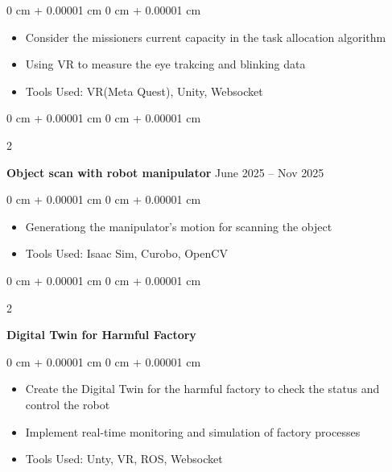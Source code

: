 \documentclass[10pt, letterpaper]{article}
\newenvironment{highlights}{
    \begin{itemize}[
        topsep=0.10 cm,
        parsep=0.10 cm,
        partopsep=0pt,
        itemsep=0pt,
        leftmargin=0 cm + 10pt
    ]
}{
    \end{itemize}
} %
\newenvironment{onecolentry}{
    \begin{adjustwidth}{
        0 cm + 0.00001 cm
    }{
        0 cm + 0.00001 cm
    }
}{
    \end{adjustwidth}
} %
\newenvironment{twocolentry}[2][]{
    \onecolentry
    \def\secondColumn{#2}
    \setcolumnwidth{\fill, 4.5 cm}
    \begin{paracol}{2}
}{
    \switchcolumn \raggedleft \secondColumn
    \end{paracol}
    \endonecolentry
} %
\begin{document}
        \vspace{0.10 cm}
        \begin{onecolentry}
            \begin{highlights}
                \item Consider the missioners current capacity in the task allocation algorithm
                \item Using VR to measure the eye trakcing and blinking data
                \item Tools Used: VR(Meta Quest), Unity, Websocket
            \end{highlights}
        \end{onecolentry}


        \vspace{0.2 cm}

        \begin{twocolentry}{
            June 2025 -- Nov 2025
        }
            \textbf{Object scan with robot manipulator}\end{twocolentry}

        \vspace{0.10 cm}
        \begin{onecolentry}
            \begin{highlights}
                \item Generationg the manipulator's motion for scanning the object
                \item Tools Used: Isaac Sim, Curobo, OpenCV
            \end{highlights}
        \end{onecolentry}


        \vspace{0.2 cm}

        \begin{twocolentry}{
            2002
        }
            \textbf{Digital Twin for Harmful Factory}\end{twocolentry}

        \vspace{0.10 cm}
        \begin{onecolentry}
            \begin{highlights}
                \item Create the Digital Twin for the harmful factory to check the status and control the robot
                \item Implement real-time monitoring and simulation of factory processes
                \item Tools Used: Unty, VR, ROS, Websocket
            \end{highlights}
        \end{onecolentry}
\end{document}
